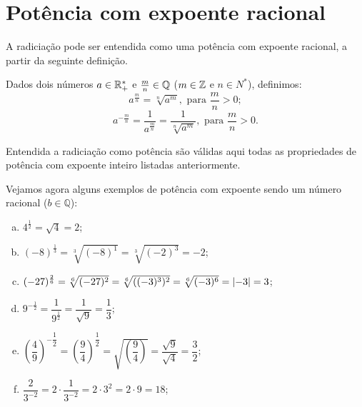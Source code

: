  \section{Potência com expoente racional}

 A radiciação pode ser entendida como uma potência com expoente racional, a partir da seguinte definição.
 \vskip0.3cm

 \colorbox{azul}{
 \begin{minipage}{0.9\linewidth}
 \begin{center}
  Dados dois números $a \in \mathbb{R}^{*}_{+}$ e $\frac{m}{n} \in \mathbb{Q}$ ($m \in \mathbb{Z}$ e $n \in N^{*}$), definimos:
\begin{equation}
a^{\frac{m}{n}}= \sqrt[n]{a^m}, \text{ para } \frac{m}{n} >0 ;
\end{equation}
\begin{equation}
a^{-\frac{m}{n}}= \frac{1}{a^{\frac{m}{n}}}= \frac{1}{\sqrt[n]{a^m}},  \text{ para } \frac{m}{n} >0.
\end{equation}
 \end{center}
 \end{minipage}}

 \vskip0.3cm

 Entendida a radiciação como potência são válidas aqui todas as propriedades de potência com expoente inteiro listadas anteriormente.

 \begin{exem}
  Vejamos agora alguns exemplos de potência com expoente sendo um número racional ($b \in \mathbb{Q}$):
  \begin{enumerate}[a)]
   \item $4^{\frac{1}{2}}= \sqrt{4}= 2$;
   \item $(-8)^{\frac{1}{3}}= \sqrt[3]{(-8)^1}= \sqrt[3]{(-2)^{3}}= -2$;
   \item $(-27)^{\frac{2}{6}}= \sqrt[6]{(-27)^2}= \sqrt[6]{((-3)^3)^2}= \sqrt[6]{(-3)^6} = \left|-3\right| = 3$;
   \item $9^{-\frac{1}{2}}= \dfrac{1}{9^{\frac{1}{2}}}= \dfrac{1}{\sqrt{9}}= \dfrac{1}{3}$;
   \item $\left(\dfrac{4}{9}\right)^{-\dfrac{1}{2}}= \left(\dfrac{9}{4}\right)^{\dfrac{1}{2}}= \sqrt{\left(\dfrac{9}{4}\right)}=\dfrac{\sqrt{9}}{\sqrt{4}}= \dfrac{3}{2}$;
   \item $\dfrac{2}{3^{-2}}= 2 \cdot \dfrac{1}{3^{-2}}= 2 \cdot 3^{2}= 2 \cdot 9= 18$;
  \end{enumerate}

 \end{exem}



